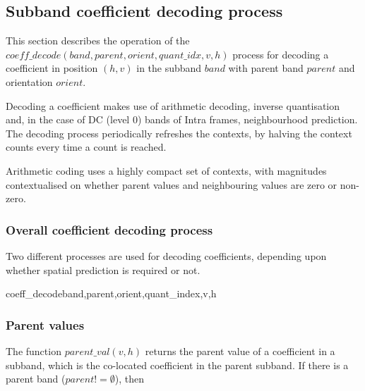 \subsection{Subband coefficient decoding process}

\label{wltcoeff}

This section describes the operation of the 
$coeff\_decode(band,parent,orient,quant\_idx,v,h)$ process
for decoding a coefficient in position $(h,v)$ in the subband $band$ with
parent band $parent$ and orientation $orient$.

Decoding a coefficient makes use of arithmetic decoding, inverse quantisation
and, in the case of DC (level 0) bands of Intra frames, neighbourhood prediction.
The decoding process periodically refreshes the contexts, by
halving the context counts every time a count is reached.

Arithmetic coding uses a highly compact set of contexts, 
with magnitudes contextualised on whether parent values
and neighbouring values are zero or non-zero.

\subsubsection{Overall coefficient decoding process}

Two different processes are used for decoding coefficients, depending
upon whether spatial prediction is required or not.

\begin{pseudo}{coeff\_decode}{band,parent,orient,quant\_index,v,h}
\end{pseudo}


\subsubsection{Parent values}
\label{parentval}
The function $parent\_val(v, h)$ returns the parent value of a coefficient in a subband,
which is the co-located coefficient in the parent subband. If there is a parent band 
($parent!=\emptyset$), then

